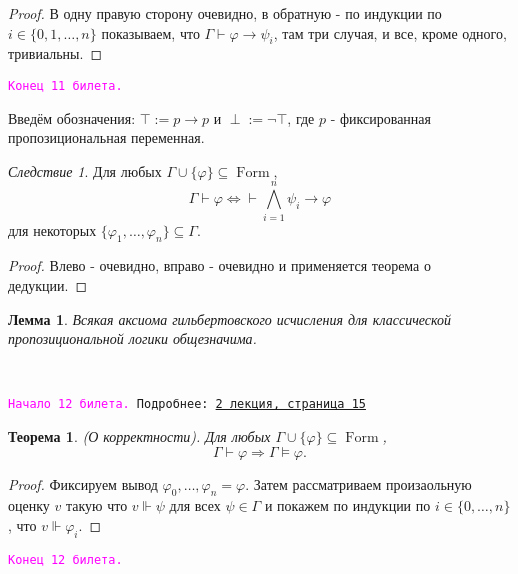 \documentclass[a4paper,100pt]{article}
\theoremstyle{indented}
\newtheorem{theorem}{Теорема}
\newtheorem{lemma}{Лемма}
\theoremstyle{definition}
\theoremstyle{remark}
\newtheorem{cons}{Следствие}
\DeclareMathOperator{\form}{Form}
\begin{document}
\begin{proof}
  В одну правую сторону очевидно, в обратную - по индукции по $i\in\{0, 1, \ldots, n\}$ показываем, что $\Gamma\vdash \varphi\rightarrow \psi_i$, там три случая, и все, кроме одного, тривиальны.
\end{proof}

\texttt{\textcolor{magenta}{Конец 11 билета.}} 

\hrulefill

Введём обозначения: $\top:= p\rightarrow p$ и $\perp := \neg \top$, где $p$ - фиксированная пропозициональная переменная.

\begin{cons}
  Для любых $\Gamma\cup \{\varphi\}\subseteq \form$, 
  \[
    \Gamma \vdash \varphi \Longleftrightarrow \vdash \bigwedge_{i=1}^n \psi_i\rightarrow \varphi
  \]
  для некоторых $\{\varphi_1, \ldots, \varphi_n\}\subseteq \Gamma$.
\end{cons}

\begin{proof}
  Влево - очевидно, вправо - очевидно и применяется теорема о дедукции.
\end{proof}

\begin{lemma}
  Всякая аксиома гильбертовского исчисления для классической пропозициональной логики общезначима.
\end{lemma}\ 

\hrulefill

\texttt{\hypertarget{b12}{\textcolor{magenta}{Начало 12 билета.}} Подробнее: \href{http://www.mi-ras.ru/~speranski/courses/logic-1-2021-spring/slides_2.pdf}{2 лекция, страница 15}} \\

\begin{theorem}
  (О корректности). Для любых $\Gamma \cup \{\varphi\}\subseteq \form$, 
  \[
    \Gamma \vdash \varphi \Longrightarrow \Gamma \vDash \varphi. 
  \]
\end{theorem}

\begin{proof}
  Фиксируем вывод $\varphi_0, \ldots, \varphi_n = \varphi$. Затем рассматриваем произаольную оценку $v$ такую что $v\Vdash \psi$ для всех $\psi \in \Gamma$ и покажем по индукции по $i\in\{0, \ldots, n\}$, что $v\Vdash \varphi_i$.
\end{proof}

\texttt{\textcolor{magenta}{Конец 12 билета.}} 

\hrulefill
\end{document}
